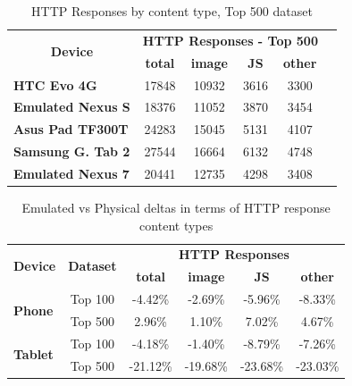 \documentclass{acm_proc_article-sp}
\begin{document}
\begin{table}[h]
  \centering
  \caption{HTTP Responses by content type, Top 500 dataset}
    \begin{tabular}{|c|c|c|c|c|c|}
    \hline
    \multicolumn{1}{|c|}{\multirow{2}[4]{*}{\textbf{Device}}} & \multicolumn{4}{|c|}{\textbf{HTTP Responses - Top 500}} \\ \cline{2-5}
    \multicolumn{1}{|c|}{} & \textbf{total} & \textbf{image} & \textbf{JS} & \textbf{other} \\ \hline
    \multicolumn{1}{|l|}{\textbf{HTC Evo 4G}} & 17848 & 10932 & 3616  & 3300 \\
    \multicolumn{1}{|l|}{\textbf{Emulated Nexus S}} & 18376 & 11052 & 3870  & 3454 \\
    \multicolumn{1}{|l|}{\textbf{Asus Pad TF300T}} & 24283 & 15045 & 5131  & 4107 \\
    \multicolumn{1}{|l|}{\textbf{Samsung G. Tab 2}} & 27544 & 16664 & 6132  & 4748 \\
    \multicolumn{1}{|l|}{\textbf{Emulated Nexus 7}} & 20441 & 12735 & 4298  & 3408 \\
 \hline
    \end{tabular}%
  \label{tab:http_500}%
\end{table}%

\begin{table}[h]
  \centering
  \caption{Emulated vs Physical deltas in terms of HTTP response content types}
    \begin{tabular}{|c|c|c|c|c|c|}
    \hline
    \multicolumn{1}{|c|}{\multirow{2}[4]{*}{\textbf{Device}}} & \multicolumn{1}{|c|}{\multirow{2}[4]{*}{\textbf{Dataset}}} & \multicolumn{4}{|c|}{\textbf{HTTP Responses}} \\ \cline{3-6}
    \multicolumn{1}{|c|}{} & \multicolumn{1}{|c|}{} & \multicolumn{1}{|c|}{\textbf{total}} & \multicolumn{1}{|c|}{\textbf{image}} & \multicolumn{1}{|c|}{\textbf{JS}} & \multicolumn{1}{|c|}{\textbf{other}} \\ \hline
    \multicolumn{1}{|l|}{\multirow{2}[4]{*}{\textbf{Phone}}} & Top 100 & -4.42\% & -2.69\% & -5.96\% & -8.33\% \\
    \multicolumn{1}{|l|}{} & Top 500 & 2.96\% & 1.10\% & 7.02\% & 4.67\% \\ \hline
    \multicolumn{1}{|l|}{\multirow{2}[4]{*}{\textbf{Tablet}}} & Top 100 & -4.18\% & -1.40\% & -8.79\% & -7.26\% \\
    \multicolumn{1}{|l|}{} & Top 500 & -21.12\% & -19.68\% & -23.68\% & -23.03\% \\ \hline
    \end{tabular}%
  \label{tab:http_diffs}%
\end{table}%
\vspace{-1em}
\end{document}
